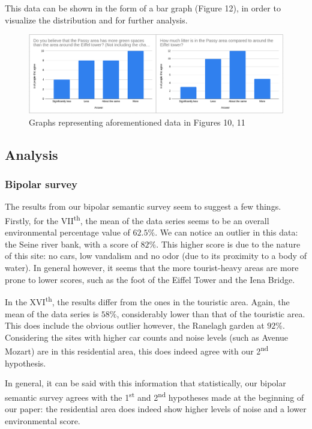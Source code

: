 \documentclass[11pt,letterpaper]{article}
\begin{document}
This data can be shown in the form of a bar graph (Figure 12), in order to visualize the distribution and for further analysis.

\begin{figure}[H]
    \centering
    \includegraphics[width=1\linewidth]{media/graphs.png}
    \caption{Graphs representing aforementioned data in Figures 10, 11}
\end{figure}

\subsection{Analysis}

\subsubsection{Bipolar survey}

The results from our bipolar semantic survey seem to suggest a few things. Firstly, for the VII\textsuperscript{th}, the mean of the data series seems to be an overall environmental percentage value of $62.5\%$. We can notice an outlier in this data: the Seine river bank, with a score of $82\%$. This higher score is due to the nature of this site: no cars, low vandalism and no odor (due to its proximity to a body of water). In general however, it seems that the more tourist-heavy areas are more prone to lower scores, such as the foot of the Eiffel Tower and the Iena Bridge.

In the XVI\textsuperscript{th}, the results differ from the ones in the touristic area. Again, the mean of the data series is $58\%$, considerably lower than that of the touristic area. This does include the obvious outlier however, the Ranelagh garden at $92\%$. Considering the sites with higher car counts and noise levels (such as Avenue Mozart) are in this residential area, this does indeed agree with our 2\textsuperscript{nd} hypothesis.

In general, it can be said with this information that statistically, our bipolar semantic survey agrees with the 1\textsuperscript{st} and 2\textsuperscript{nd} hypotheses made at the beginning of our paper: the residential area does indeed show higher levels of noise and a lower environmental score.
\end{document}
